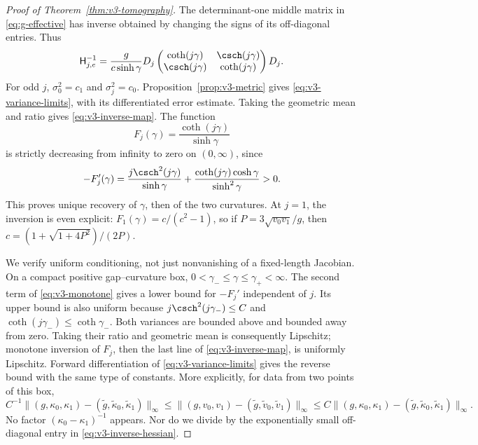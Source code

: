 \begin{proof}[Proof of Theorem~\ref{thm:v3-tomography}]
The determinant-one middle matrix in \eqref{eq:g-effective} has inverse
obtained by changing the signs of its off-diagonal entries. Thus
\begin{equation}\label{eq:v3-inverse-hessian}
 \mathsf H_{j,e}^{-1}=\frac{g}{c\sinh\gamma}D_j
 \begin{pmatrix}\coth(j\gamma)&\csch(j\gamma)\\
 \csch(j\gamma)&\coth(j\gamma)\end{pmatrix}D_j.
\end{equation}
For odd $j$, $\sigma_0^2=c_1$ and $\sigma_j^2=c_0$.
Proposition~\ref{prop:v3-metric} gives
\eqref{eq:v3-variance-limits}, with its differentiated error estimate.
Taking the geometric mean and ratio gives \eqref{eq:v3-inverse-map}.
The function
\[
 F_j(\gamma)=\frac{\coth(j\gamma)}{\sinh\gamma}
\]
is strictly decreasing from infinity to zero on $(0,\infty)$, since
\begin{equation}\label{eq:v3-monotone}
 -F_j'(\gamma)=
 \frac{j\csch^2(j\gamma)}{\sinh\gamma}
 +\frac{\coth(j\gamma)\cosh\gamma}{\sinh^2\gamma}>0.
\end{equation}
This proves unique recovery of $\gamma$, then of the two curvatures.
At $j=1$, the inversion is even explicit:
$F_1(\gamma)=c/(c^2-1)$, so if
$P=3\sqrt{v_0v_1}/g$, then
$c=(1+\sqrt{1+4P^2})/(2P)$.

We verify uniform conditioning, not just nonvanishing of a fixed-length
Jacobian. On a compact positive gap--curvature box,
$0<\gamma_-\le\gamma\le\gamma_+<\infty$. The second term of
\eqref{eq:v3-monotone} gives a lower bound for $-F_j'$ independent
of $j$. Its upper bound is also uniform because
$j\csch^2(j\gamma_-)\le C$ and
$\coth(j\gamma_-)\le\coth\gamma_-$. Both variances are bounded
above and bounded away from zero. Taking their ratio and geometric
mean is consequently Lipschitz; monotone inversion of $F_j$, then
the last line of \eqref{eq:v3-inverse-map}, is uniformly Lipschitz.
Forward differentiation of \eqref{eq:v3-variance-limits} gives the
reverse bound with the same type of constants. More explicitly,
for data from two points of this box,
\begin{equation}\label{eq:v3-bilip}
 C^{-1}\|(g,\kappa_0,\kappa_1)-(\widetilde g,
          \widetilde\kappa_0,\widetilde\kappa_1)\|_\infty
 \le \|(g,v_0,v_1)-(\widetilde g,\widetilde v_0,\widetilde v_1)\|_\infty
 \le C\|(g,\kappa_0,\kappa_1)-(\widetilde g,
          \widetilde\kappa_0,\widetilde\kappa_1)\|_\infty.
\end{equation}
No factor $(\kappa_0-\kappa_1)^{-1}$ appears. Nor do we divide by
the exponentially small off-diagonal entry in
\eqref{eq:v3-inverse-hessian}.


\end{proof}
